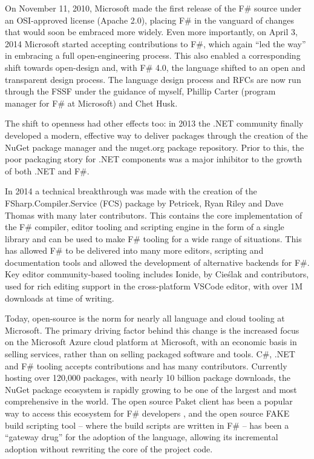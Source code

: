 \documentclass[acmsmall,review]{acmart}\settopmatter{printfolios=true,printccs=false,printacmref=false}
\begin{document}
On November 11, 2010, Microsoft made the first release of the F\# source under an OSI-approved license (Apache 2.0), placing F\# in the vanguard of changes that would soon be embraced more widely.  Even more importantly, on April 3, 2014 Microsoft started accepting contributions to F\#, which again “led the way” in embracing a full open-engineering process.  This also enabled a corresponding shift towards open-design and, with F\# 4.0, the language shifted to an open and transparent design process.   The language design process and RFCs are now run through the FSSF under the guidance of myself, Phillip Carter (program manager for F\# at Microsoft) and Chet Husk.

The shift to openness had other effects too: in 2013 the .NET community finally developed a modern, effective way to deliver packages through the creation of the NuGet package manager and the nuget.org package repository.  Prior to this, the poor packaging story for .NET components was a major inhibitor to the growth of both .NET and F\#.  

In 2014 a technical breakthrough was made with the creation of the FSharp.Compiler.Service (FCS) package by Petricek, Ryan Riley and Dave Thomas with many later contributors.   This contains the core implementation of the F\# compiler, editor tooling and scripting engine in the form of a single library and can be used to make F\# tooling for a wide range of situations.  This has allowed F\# to be delivered into many more editors, scripting and documentation tools and allowed the development of alternative backends for F\#.   Key editor community-based tooling includes Ionide, by Cieślak and contributors, used for rich editing support in the cross-platform VSCode editor, with over 1M downloads at time of writing. 

Today, open-source is the norm for nearly all language and cloud tooling at Microsoft. The primary driving factor behind this change is the increased focus on the Microsoft Azure cloud platform at Microsoft, with an economic basis in selling services, rather than on selling packaged software and tools. C\#, .NET and F\# tooling accepts contributions and has many contributors. Currently hosting over 120,000 packages, with nearly 10 billion package downloads, the NuGet package ecosystem is rapidly growing to be one of the largest and most comprehensive in the world.  The open source Paket client has been a popular way to access this ecosystem for F\# developers , and the open source FAKE build scripting tool – where the build scripts are written in F\# – has been a “gateway drug” for the adoption of the language, allowing its incremental adoption without rewriting the core of the project code. 
\end{document}
